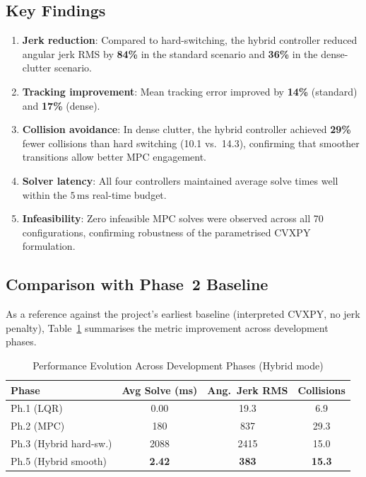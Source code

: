 \documentclass[journal]{IEEEtran}
\begin{document}
\subsection{Key Findings}

\begin{enumerate}
  \item \textbf{Jerk reduction}: Compared to hard-switching, the hybrid
    controller reduced angular jerk RMS by \textbf{84\%} in the standard
    scenario and \textbf{36\%} in the dense-clutter scenario.
  \item \textbf{Tracking improvement}: Mean tracking error improved by
    \textbf{14\%} (standard) and \textbf{17\%} (dense).
  \item \textbf{Collision avoidance}: In dense clutter, the hybrid controller
    achieved \textbf{29\%} fewer collisions than hard switching
    (10.1 vs.\ 14.3), confirming that smoother transitions allow better MPC
    engagement.
  \item \textbf{Solver latency}: All four controllers maintained average
    solve times well within the \(5\,\text{ms}\) real-time budget.
  \item \textbf{Infeasibility}: Zero infeasible MPC solves were observed
    across all 70 configurations, confirming robustness of the parametrised
    CVXPY formulation.
\end{enumerate}

\subsection{Comparison with Phase~2 Baseline}

As a reference against the project's earliest baseline (interpreted CVXPY,
no jerk penalty), Table~\ref{tab:evolution} summarises the metric improvement
across development phases.

\begin{table}[!t]
  \caption{Performance Evolution Across Development Phases (Hybrid mode)}
  \label{tab:evolution}
  \centering
  \begin{tabular}{lccc}
    \toprule
    Phase         & Avg Solve (ms) & Ang.\ Jerk RMS & Collisions \\
    \midrule
    Ph.1 (LQR)    & 0.00           & 19.3           & 6.9 \\
    Ph.2 (MPC)    & 180            & 837            & 29.3 \\
    Ph.3 (Hybrid hard-sw.) & 2088    & 2415          & 15.0 \\
    Ph.5 (Hybrid smooth)   & \textbf{2.42} & \textbf{383} & \textbf{15.3} \\
    \bottomrule
  \end{tabular}
\end{table}
\end{document}
